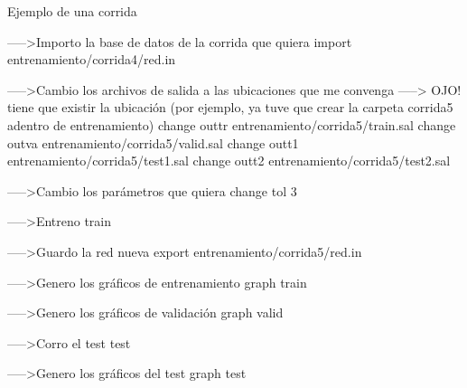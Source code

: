 Ejemplo de una corrida

----->Importo la base de datos de la corrida que quiera
import entrenamiento/corrida4/red.in

----->Cambio los archivos de salida a las ubicaciones que me convenga
-----> OJO! tiene que existir la ubicación (por ejemplo, ya tuve que crear la carpeta corrida5 adentro de entrenamiento)
change outtr entrenamiento/corrida5/train.sal
change outva entrenamiento/corrida5/valid.sal
change outt1 entrenamiento/corrida5/test1.sal
change outt2 entrenamiento/corrida5/test2.sal

----->Cambio los parámetros que quiera
change tol 3

----->Entreno
train

----->Guardo la red nueva
export entrenamiento/corrida5/red.in

----->Genero los gráficos de entrenamiento
graph train

----->Genero los gráficos de validación
graph valid

----->Corro el test
test

----->Genero los gráficos del test
graph test